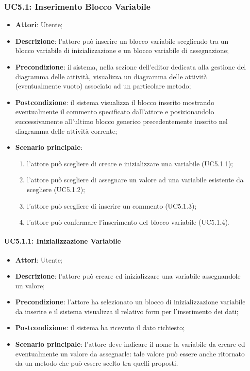 \subsubsection{UC5.1: Inserimento Blocco Variabile}
\label{UC5.1}
\begin{itemize}
\item \textbf{Attori}: Utente;
\item \textbf{Descrizione}: l'attore può inserire un blocco variabile scegliendo tra un blocco variabile di inizializzazione e un blocco variabile di assegnazione;
\item \textbf{Precondizione}: il sistema, nella sezione dell'editor dedicata alla gestione del diagramma delle attività, visualizza un diagramma delle attività (eventualmente vuoto) associato ad un particolare metodo;
\item \textbf{Postcondizione}: il sistema visualizza il blocco inserito mostrando eventualmente il commento specificato dall'attore e posizionandolo successivamente all'ultimo blocco generico precedentemente inserito nel diagramma delle attività corrente;
\item \textbf{Scenario principale}:
\begin{enumerate}
\item l'attore può scegliere di creare e inizializzare una variabile (UC5.1.1);
\item l'attore può scegliere di assegnare un valore ad una variabile esistente da scegliere (UC5.1.2);
\item l'attore può scegliere di inserire un commento (UC5.1.3);
\item l'attore può confermare l'inserimento del blocco variabile (UC5.1.4).
\end{enumerate}
\end{itemize}

\paragraph{UC5.1.1: Inizializzazione Variabile}
\label{UC5.1.1}
\begin{itemize}
\item \textbf{Attori}: Utente;
\item \textbf{Descrizione}: l'attore può creare ed inizializzare una variabile assegnandole un valore;
\item \textbf{Precondizione}: l'attore ha selezionato un blocco di inizializzazione variabile da inserire e il sistema visualizza il relativo form per l'inserimento dei dati;
\item \textbf{Postcondizione}: il sistema ha ricevuto il dato richiesto;
\item \textbf{Scenario principale}:
l'attore deve indicare il nome la variabile da creare ed eventualmente un valore da assegnarle: tale valore può essere anche ritornato da un metodo che può essere scelto tra quelli proposti.
\end{itemize}

